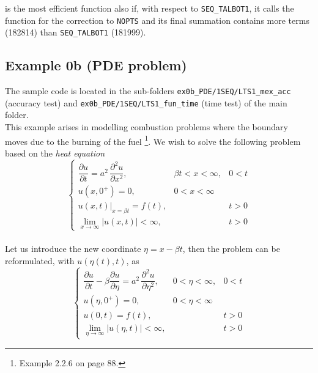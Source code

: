 \documentclass[a4paper,10pt]{report}%
\begin{document}
\newpage
{} is the most efficient function also if, with respect to {\tt SEQ\_TALBOT1},
it calls the function for the correction to {\tt NOPTS} and its final summation contains more terms (182814)
than {\tt SEQ\_TALBOT1} (181999).



\subsection{Example 0b (PDE problem)}\label{EXAMPLE:0b}
The sample code is located in the sub-folders {\tt ex0b\_PDE/1SEQ/LTS1\_mex\_acc} (accuracy test) and
{\tt ex0b\_PDE/1SEQ/LTS1\_fun\_time} (time test) of the main folder.
\\
This example arises in modelling combustion problems where the boundary moves due to the burning of the fuel
\cite{DUFFY:2004}\footnote{ Example 2.2.6 on page 88.}.
We wish to solve the following problem based on the {\em heat equation}
\[
\left\{\begin{array}{llll}
\dfrac{\partial u}{\partial t} = a^2\,\dfrac{\partial^2 u}{\partial x^2}, & \beta t<x<\infty, & 0<t \\[8pt]
u(x,0^+) = 0,                             & 0<x<\infty \\ %
\left.u(x,t)\right|_{x=\beta t} = f(t),   && t>0       \\ %
\displaystyle{\lim_{x\rightarrow\infty}}|u(x,t)|<\infty, && t>0
\end{array}\right.
\]
\\
Let us introduce the new coordinate $\eta = x-\beta t$, then the problem can be reformulated, with $u(\eta(t),t)$, as
\begin{equation}\label{EX0b:PDE}
\left\{\begin{array}{llll}
\dfrac{\partial u}{\partial t} - \beta\dfrac{\partial u}{\partial\eta} = a^2\,\dfrac{\partial^2 u}{\partial\eta^2}, & 0<\eta<\infty, & 0<t \\[8pt]
u(\eta,0^+) = 0,                             & 0<\eta<\infty \\ %
u(0,t) = f(t),   && t>0 \\ %
\displaystyle{\lim_{\eta\rightarrow\infty}}|u(\eta,t)|<\infty, && t>0
\end{array}\right.
\end{equation}
\end{document}
